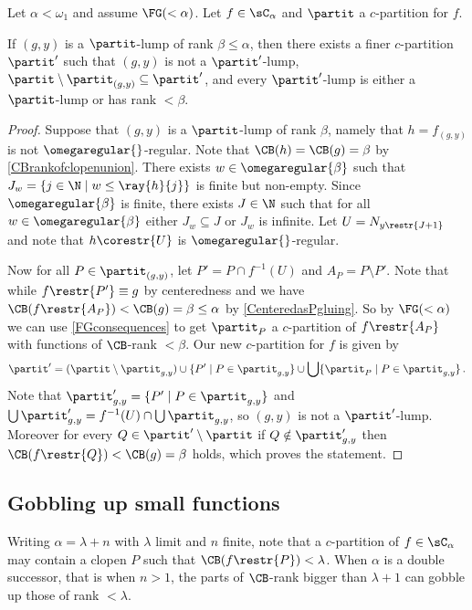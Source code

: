 \begin{lemma}\label{lemma:RefiningBy1}
Let $\alpha<\omega_1$ and assume $\FG(<\alpha)$. Let $f\in \sC_\alpha$ and $\partit$ a $c$-partition for $f$.

If $(g,y)$ is a $\partit$-lump of rank $\beta\leq\alpha$, then there exists a finer $c$-partition $\partit'$ such that $(g,y)$ is not a $\partit'$-lump,
 $\partit\setminus\partit_{(g,y)}\subseteq\partit'$, and every $\partit'$-lump is either a $\partit$-lump or has rank $<\beta$.
\end{lemma}
\begin{proof}
Suppose that $(g,y)$ is a $\partit$-lump of rank $\beta$, namely that $h=f_{(g,y)}$ is not $\omegaregular{}$-regular.
Note that $\CB(h)=\CB(g)=\beta$ by \cref{CBrankofclopenunion}.
There exists $w\in \omegaregular{\beta}$ such that $J_w=\{j\in\N\mid w\leq \ray{h}{j}\}$ is finite but non-empty.
Since $\omegaregular{\beta}$ is finite, there exists $J\in \N$ such that for all $w\in \omegaregular{\beta}$ either $J_w\subseteq J$ or $J_w$ is infinite. Let $U=N_{y\restr{J+1}}$ and note that $h\corestr{U}$ is $\omegaregular{}$-regular.

Now for all $P\in \partit_{(g,y)}$, let $P'=P\cap f^{-1}(U)$ and $A_P=P\setminus P'$. Note that while $f\restr{P'}\equiv g$ by centeredness and we have $\CB(f\restr{A_P})<\CB(g)=\beta\leq\alpha$ by \cref{CenteredasPgluing}.
So by $\FG(<\alpha)$ we can use \cref{FGconsequences} to get $\partit_P$ a $c$-partition of $f\restr{A_P}$ with functions of $\CB$-rank $<\beta$.
Our new $c$-partition for $f$ is given by 
\[
\partit'=(\partit\setminus \partit_{g,y})\cup \{P' \mid P\in \partit_{g,y}\} \cup \bigcup \{\partit_P \mid P\in \partit_{g,y}\}\,.
\]
Note that $\partit'_{g,y}=\{P'\mid P\in \partit_{g,y}\}$ and $\bigcup \partit'_{g,y}=f^{-1}(U)\cap \bigcup \partit_{g,y}$, so $(g,y)$ is not a $\partit'$-lump. %
Moreover for every $Q\in \partit'\setminus \partit$ if $Q\notin \partit'_{g,y}$ then $\CB(f\restr{Q})<\CB(g)=\beta$ holds, which proves the statement.
\end{proof}


\subsection{Gobbling up small functions}

Writing $\alpha=\lambda+n$ with $\lambda$ limit and $n$ finite, note that a $c$-partition of $f\in\sC_\alpha$ may contain a clopen $P$ such that $\CB(f\restr{P})<\lambda$.
When $\alpha$ is a double successor, that is when $n>1$, the parts of $\CB$-rank bigger than $\lambda+1$ can gobble up those of rank $<\lambda$.

